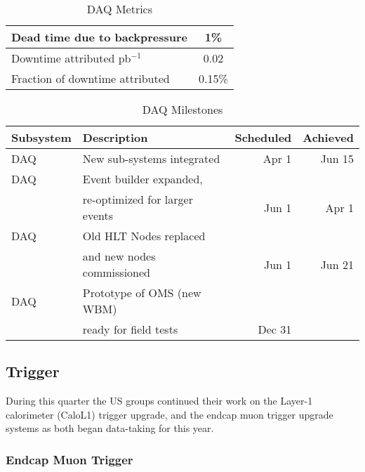 \begin{table}[htp]
\caption{DAQ Metrics}
\begin{center}
\begin{tabular}{|l|c|}
\hline
Dead time due to backpressure &1\%  \\
\hline
Downtime attributed pb$^{-1}$ &0.02 \\
Fraction of downtime attributed&0.15\% \\
\hline
\end{tabular}
\end{center}
\label{DAQMetrics}
\end{table}%
\begin{table}[h]
\caption{DAQ Milestones}
\begin{center}
\begin{tabular}{|l|l|r|r|}
\hline
Subsystem&Description&Scheduled&Achieved\\
\hline
DAQ& New sub-systems integrated  & Apr 1&Jun 15 \\
\hline
DAQ& Event builder expanded, & &\\
   & re-optimized for larger events & Jun 1 &Apr 1 \\
\hline
DAQ& Old HLT Nodes replaced & &\\
   & and new nodes commissioned & Jun 1 &Jun 21 \\
\hline
DAQ& Prototype of OMS (new WBM) & &\\ 
   & ready for field tests &Dec 31& \\
\hline
\end{tabular}
\end{center}
\label{DAQMilestones}
\end{table}%

\subsection{Trigger}

During this quarter the US groups continued their work on the Layer-1 calorimeter (CaloL1) trigger upgrade, and the endcap muon trigger upgrade systems as both began data-taking for this year.

\subsubsection{Endcap Muon Trigger}

